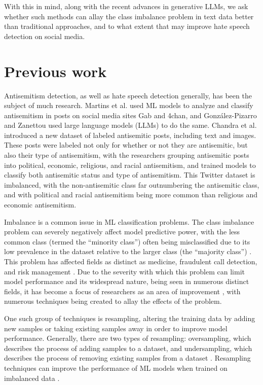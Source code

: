 \documentclass[runningheads]{llncs}
\begin{document}
With this in mind, along with the recent advances in generative LLMs, we ask whether such methods can allay the class imbalance problem in text data better than traditional approaches, and to what extent that may improve hate speech detection on social media.

\section{Previous work}
Antisemitism detection, as well as hate speech detection generally, has been the subject of much research. Martins et al. \cite{martins} used ML models to analyze and classify antisemitism in posts on social media sites Gab and 4chan, and González-Pizarro and Zanettou \cite{gonzalez} used large language models (LLMs) to do the same. Chandra et al. \cite{chandra} introduced a new dataset of labeled antisemitic posts, including text and images. These posts were labeled not only for whether or not they are antisemitic, but also their type of antisemitism, with the researchers grouping antisemitic posts into political, economic, religious, and racial antisemitism, and trained models to classify both antisemitic status and type of antisemitism. This Twitter dataset is imbalanced, with the non-antisemitic class far outnumbering the antisemitic class, and with political and racial antisemitism being more common than religious and economic antisemitism.

Imbalance is a common issue in ML classification problems. The class imbalance problem can severely negatively affect model predictive power, with the less common class (termed the ``minority class'') often being misclassified due to its low prevalence in the dataset relative to the larger class (the ``majority class'') \cite{abdelrahman}. This problem has affected fields as distinct as medicine, fraudulent call detection, and risk management \cite{sun}. Due to the severity with which this problem can limit model performance and its widespread nature, being seen in numerous distinct fields, it has become a focus of researchers as an area of improvement \cite{abdelrahman}, with numerous techniques being created to allay the effects of the problem.

One such group of techniques is resampling, altering the training data by adding new samples or taking existing samples away in order to improve model performance. Generally, there are two types of resampling: oversampling, which describes the process of adding samples to a dataset, and undersampling, which describes the process of removing existing samples from a dataset \cite{shelke}. Resampling techniques can improve the performance of ML models when trained on imbalanced data \cite{lee} \cite{khushi}.
\end{document}
